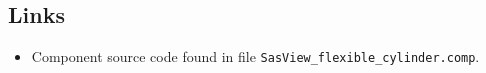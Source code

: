 \subsection*{Links}
\begin{itemize}
  \item Component source code found in file \texttt{SasView\_flexible\_cylinder.comp}.
\end{itemize}
